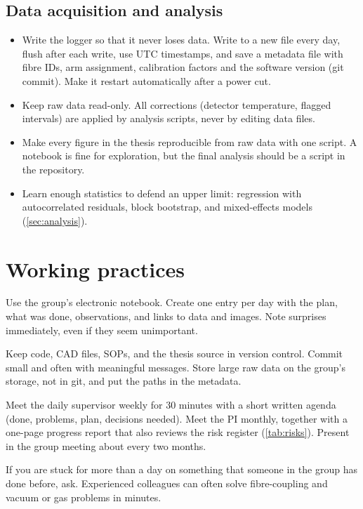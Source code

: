 \subsection{Data acquisition and analysis}
\begin{itemize}
  \item Write the logger so that it never loses data. Write to a new file every day, flush after each
        write, use UTC timestamps, and save a metadata file with fibre IDs, arm assignment, calibration
        factors and the software version (git commit). Make it restart automatically after a power cut.
  \item Keep raw data read-only. All corrections (detector temperature, flagged intervals) are applied
        by analysis scripts, never by editing data files.
  \item Make every figure in the thesis reproducible from raw data with one script. A notebook is fine
        for exploration, but the final analysis should be a script in the repository.
  \item Learn enough statistics to defend an upper limit: regression with autocorrelated residuals,
        block bootstrap, and mixed-effects models (\cref{sec:analysis}).
\end{itemize}

\section{Working practices}
\begin{description}[style=nextline,leftmargin=1.2em,itemsep=3pt]
  \item[Lab notebook] Use the group's electronic notebook. Create one entry per day with the plan,
        what was done, observations, and links to data and images. Note surprises immediately, even if
        they seem unimportant.
  \item[Repository] Keep code, CAD files, SOPs, and the thesis source in version control. Commit small
        and often with meaningful messages. Store large raw data on the group's storage, not in git, and
        put the paths in the metadata.
  \item[Meetings] Meet the daily supervisor weekly for 30 minutes with a short written agenda (done,
        problems, plan, decisions needed). Meet the PI monthly, together with a one-page progress
        report that also reviews the risk register (\cref{tab:risks}). Present in the group meeting
        about every two months.
  \item[Asking for help] If you are stuck for more than a day on something that someone in the group
        has done before, ask. Experienced colleagues can often solve fibre-coupling and vacuum or gas
        problems in minutes.
\end{description}


